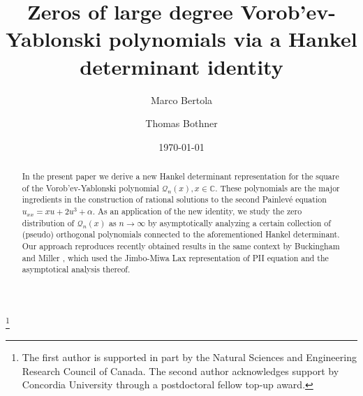 \documentclass[10pt,oneside,reqno]{amsart}
\numberwithin{equation}{section}
\begin{document}


\title[Zeros of large degree Vorob'ev-Yablonski polynomials via a Hankel determinant identity]{Zeros of large degree Vorob'ev-Yablonski polynomials via a Hankel determinant identity}

\author{Marco Bertola}
\address{Centre de recherches math\'ematiques,
Universit\'e de Montr\'eal, C.~P.~6128, succ. centre ville, Montr\'eal,
Qu\'ebec, Canada H3C 3J7 and,
Department of Mathematics and
Statistics, Concordia University, 1455 de Maisonneuve W., Montr\'eal, Qu\'ebec,
Canada H3G 1M8}

\author{Thomas Bothner}
\address{Centre de recherches math\'ematiques,
Universit\'e de Montr\'eal, C.~P.~6128, succ. centre ville, Montr\'eal,
Qu\'ebec, Canada H3C 3J7 and,
Department of Mathematics and
Statistics, Concordia University, 1455 de Maisonneuve W., Montr\'eal, Qu\'ebec,
Canada H3G 1M8}



\thanks{The first author is supported
in part by the Natural Sciences and Engineering Research Council of Canada. The second author acknowledges support by Concordia University through a postdoctoral fellow
top-up award.}

\date{\today}

\begin{abstract}
In the present paper we derive a new Hankel determinant representation for the square of the Vorob'ev-Yablonski polynomial $\mathcal{Q}_n(x),x\in\mathbb{C}$. These polynomials are 
the major ingredients in the construction of rational solutions to the second Painlev\'e equation $u_{xx}=xu+2u^3+\alpha$. As an application of the new identity, we
study the zero distribution of $\mathcal{Q}_n(x)$ as $n\rightarrow\infty$ by asymptotically analyzing a certain collection of (pseudo) orthogonal polynomials connected
to the aforementioned Hankel determinant. Our approach reproduces recently obtained results in the same context by Buckingham and Miller \cite{BM}, which used the Jimbo-Miwa
Lax representation of PII equation and the asymptotical analysis thereof.
\end{abstract}
\maketitle
%
\end{document}
